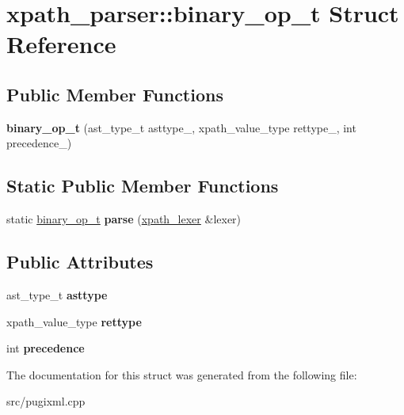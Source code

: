 \hypertarget{structxpath__parser_1_1binary__op__t}{}\section{xpath\+\_\+parser\+:\+:binary\+\_\+op\+\_\+t Struct Reference}
\label{structxpath__parser_1_1binary__op__t}
\subsection*{Public Member Functions}
\begin{DoxyCompactItemize}
\item 
\mbox{\label{structxpath__parser_1_1binary__op__t_a6b8a545436af8aa0c74c91e181a2b865}} 
{\bfseries binary\+\_\+op\+\_\+t} (ast\+\_\+type\+\_\+t asttype\+\_\+, xpath\+\_\+value\+\_\+type rettype\+\_\+, int precedence\+\_\+)
\end{DoxyCompactItemize}
\subsection*{Static Public Member Functions}
\begin{DoxyCompactItemize}
\item 
\mbox{\label{structxpath__parser_1_1binary__op__t_a723f5f2b66df47b4ac74455cb39b9544}} 
static \hyperlink{structxpath__parser_1_1binary__op__t}{binary\+\_\+op\+\_\+t} {\bfseries parse} (\hyperlink{classxpath__lexer}{xpath\+\_\+lexer} \&lexer)
\end{DoxyCompactItemize}
\subsection*{Public Attributes}
\begin{DoxyCompactItemize}
\item 
\mbox{\label{structxpath__parser_1_1binary__op__t_a1af7e302de46bf45ffdb466cfd89fa15}} 
ast\+\_\+type\+\_\+t {\bfseries asttype}
\item 
\mbox{\label{structxpath__parser_1_1binary__op__t_a02c18d8d6d9a7ef28b2fefcb900e75bc}} 
xpath\+\_\+value\+\_\+type {\bfseries rettype}
\item 
\mbox{\label{structxpath__parser_1_1binary__op__t_a422064e11cc65c6110c422568441b69c}} 
int {\bfseries precedence}
\end{DoxyCompactItemize}


The documentation for this struct was generated from the following file\+:\begin{DoxyCompactItemize}
\item 
src/pugixml.\+cpp\end{DoxyCompactItemize}
